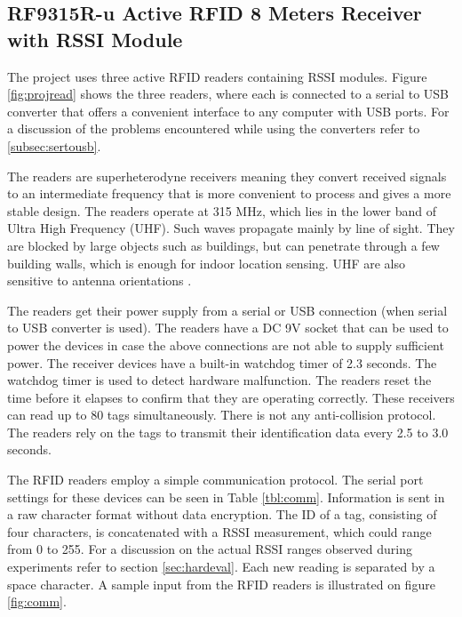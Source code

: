 \subsection{RF9315R-u Active RFID 8 Meters Receiver with RSSI Module}
\label{subsec:receiver}

The project uses three active RFID readers containing RSSI modules. Figure \ref{fig:projread} shows the three readers, where each is connected to a serial to USB converter that offers a convenient interface to any computer with USB ports. For a discussion of the problems encountered while using the converters refer to \ref{subsec:sertousb}. 

The readers are superheterodyne receivers meaning they convert received signals to an intermediate frequency that is more convenient to process and gives a more stable design. The readers operate at 315 MHz, which lies in the lower band of Ultra High Frequency (UHF). Such waves propagate mainly by line of sight. They are blocked by large objects such as buildings, but can penetrate through a few building walls, which is enough for indoor location sensing. UHF are also sensitive to antenna orientations \cite[p. 15]{Hunt2007}.

The readers get their power supply from a serial or USB connection (when serial to USB converter is used). The readers have a DC 9V socket that can be used to power the devices in case the above connections are not able to supply sufficient power. The receiver devices have a built-in watchdog timer of 2.3 seconds. The watchdog timer is used to detect hardware malfunction. The readers reset the time before it elapses to confirm that they are operating correctly. These receivers can read up to 80 tags simultaneously. There is not any anti-collision protocol. The readers rely on the tags to transmit their identification data every 2.5 to 3.0 seconds.

The RFID readers employ a simple communication protocol. The serial port settings for these devices can be seen in Table \ref{tbl:comm}. Information is sent in a raw character format without data encryption. The ID of a tag, consisting of four characters, is concatenated with a RSSI measurement, which could range from 0 to 255. For a discussion on the actual RSSI ranges observed during experiments refer to section \ref{sec:hardeval}. Each new reading is separated by a space character. A sample input from the RFID readers is illustrated on figure \ref{fig:comm}.

